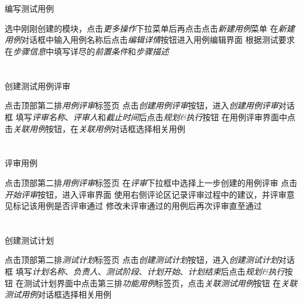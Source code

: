 \documentclass[12pt,addpoints,fleqn]{exam}
\begin{document}
\begin{questions}
\begin{parts}
  \part{}编写测试用例
  \begin{subparts}
    \subpart{}选中刚刚创建的模块，点击\emph{更多操作}下拉菜单后再点击点击\emph{新建用例}菜单
    \subpart{}在\emph{新建用例}对话框中输入用例名称后点击\emph{编辑详情}按钮进入用例编辑界面
    \subpart{}根据测试要求在\emph{步骤信息}中填写详尽的\emph{前置条件}和\emph{步骤描述}
  \end{subparts}

  \part{}创建测试用例评审
  \begin{subparts}
    \subpart{}点击顶部第二排\emph{用例评审}标签页
    \subpart{}点击\emph{创建用例评审}按钮，进入\emph{创建用例评审}对话框
    \subpart{}填写\emph{评审名称}、\emph{评审人}和\emph{截止时间}后点击\emph{规划\&执行}按钮
    \subpart{}在用例评审界面中点击\emph{关联用例}按钮，在\emph{关联用例}对话框选择相关用例
  \end{subparts}

  \part{}评审用例
  \begin{subparts}
    \subpart{}点击顶部第二排\emph{用例评审}标签页
    \subpart{}在\emph{评审}下拉框中选择上一步创建的用例评审
    \subpart{}点击\emph{开始评审}按钮，进入评审界面
    \subpart{}使用右侧评论区记录评审过程中的建议，并评审意见标记该用例是否评审通过
    \subpart{}修改未评审通过的用例后再次评审直至通过
  \end{subparts}

  \part{}创建测试计划
  \begin{subparts}
    \subpart{}点击顶部第二排\emph{测试计划}标签页
    \subpart{}点击\emph{创建测试计划}按钮，进入\emph{创建测试计划}对话框
    \subpart{}填写\emph{计划名称}、\emph{负责人}、\emph{测试阶段}、\emph{计划开始}、\emph{计划结束}后点击\emph{规划\&执行}按钮
    \subpart{}在测试计划界面中点击第三排\emph{功能用例}标签页，点击\emph{关联测试用例}按钮
    \subpart{}在\emph{关联测试用例}对话框选择相关用例
  \end{subparts}


\end{parts}
\end{questions}
\end{document}
